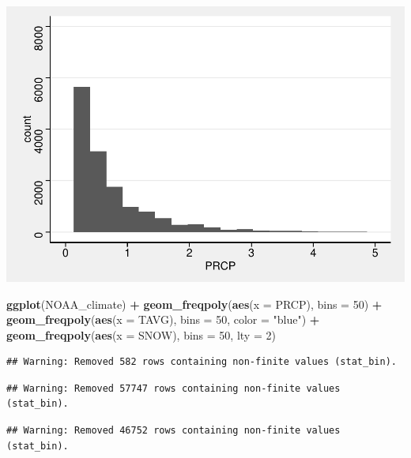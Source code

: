 \documentclass[]{article}
\newenvironment{Shaded}{\begin{snugshade}}{\end{snugshade}}
\newcommand{\DataTypeTok}[1]{\textcolor[rgb]{0.13,0.29,0.53}{#1}}
\newcommand{\DecValTok}[1]{\textcolor[rgb]{0.00,0.00,0.81}{#1}}
\newcommand{\KeywordTok}[1]{\textcolor[rgb]{0.13,0.29,0.53}{\textbf{#1}}}
\newcommand{\NormalTok}[1]{#1}
\newcommand{\OperatorTok}[1]{\textcolor[rgb]{0.81,0.36,0.00}{\textbf{#1}}}
\newcommand{\StringTok}[1]{\textcolor[rgb]{0.31,0.60,0.02}{#1}}
\begin{document}
\includegraphics{data_exploration_files/figure-latex/unnamed-chunk-5-2.pdf}

\begin{Shaded}
\begin{Highlighting}[]
\KeywordTok{ggplot}\NormalTok{(NOAA_climate) }\OperatorTok{+}
\StringTok{  }\KeywordTok{geom_freqpoly}\NormalTok{(}\KeywordTok{aes}\NormalTok{(}\DataTypeTok{x =}\NormalTok{ PRCP), }\DataTypeTok{bins =} \DecValTok{50}\NormalTok{) }\OperatorTok{+}
\StringTok{  }\KeywordTok{geom_freqpoly}\NormalTok{(}\KeywordTok{aes}\NormalTok{(}\DataTypeTok{x =}\NormalTok{ TAVG), }\DataTypeTok{bins =} \DecValTok{50}\NormalTok{, }\DataTypeTok{color =} \StringTok{"blue"}\NormalTok{) }\OperatorTok{+}
\StringTok{  }\KeywordTok{geom_freqpoly}\NormalTok{(}\KeywordTok{aes}\NormalTok{(}\DataTypeTok{x =}\NormalTok{ SNOW), }\DataTypeTok{bins =} \DecValTok{50}\NormalTok{, }\DataTypeTok{lty =} \DecValTok{2}\NormalTok{)}
\end{Highlighting}
\end{Shaded}

\begin{verbatim}
## Warning: Removed 582 rows containing non-finite values (stat_bin).
\end{verbatim}

\begin{verbatim}
## Warning: Removed 57747 rows containing non-finite values (stat_bin).
\end{verbatim}

\begin{verbatim}
## Warning: Removed 46752 rows containing non-finite values (stat_bin).
\end{verbatim}
\end{document}
